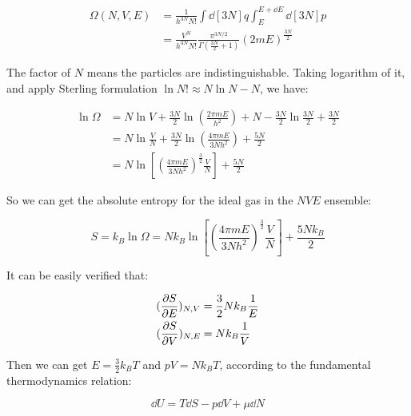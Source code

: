 \documentclass[../main.tex]{subfiles}
\begin{document}
\begin{align}
    \Omega(N, V, E) &= \frac{1}{h^{3N} N!} \int\dd[3N]{q} \int_{E}^{E + \dd E} \dd[3N]{p}\nonumber\\
    &= \frac{V^{N}}{h^{3N} N!} \frac{\pi^{3N/2}}{\Gamma\left(\frac{3N}{2} + 1\right)} (2mE)^\frac{3N}{2}
\end{align}

The factor of $N$ means the particles are indistinguishable. Taking logarithm of it, and apply Sterling formulation $\ln N! \approx N\ln N - N$, we have:

\begin{align}
    \ln \Omega &= N \ln V + \frac{3N}{2}\ln (\frac{2\pi mE}{h^2}) + N - \frac{3N}{2} \ln \frac{3N}{2} + \frac{3N}{2}\nonumber\\
    &= N \ln \frac{V}{N} + \frac{3N}{2}\ln (\frac{4\pi mE}{3N h^2}) + \frac{5N}{2} \nonumber\\
    &= N \ln\left[ (\frac{4\pi mE}{3N h^2})^\frac{3}{2} \frac{V}{N}\right]  + \frac{5N}{2}
\end{align}

So we can get the absolute entropy for the ideal gas in the $NVE$ ensemble:

\begin{equation}
    S = k_B\ln \Omega = N k_B \ln\left[ (\frac{4\pi mE}{3N h^2})^\frac{3}{2} \frac{V}{N}\right]  + \frac{5N k_B}{2}
\end{equation}

It can be easily verified that:

\begin{align}
    (\pdv{S}{E})_{N, V} &= \frac{3}{2}N k_B \frac{1}{E}\\
    (\pdv{S}{V})_{N, E} &= N k_B \frac{1}{V} 
\end{align}

Then we can get $E = \frac{3}{2} k_B T$ and $pV = N k_B T$, according to the fundamental thermodynamics relation:

\begin{equation}
    \dd U = T\dd S - p\dd V + \mu\dd N
\end{equation}
\end{document}

